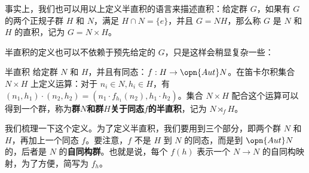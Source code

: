 事实上，我们也可以用以上定义半直积的语言来描述直积：给定群 $G$，如果有 $G$ 的两个正规子群 $H$ 和 $N$，满足 $H\cap N=\{e\}$，并且 $G=NH$，那么称 $G$ 是 $N$ 和 $H$ 的直积，记为 $G=N\times H$。

半直积的定义也可以不依赖于预先给定的 $G$，只是这样会稍显复杂一些：

\begin{definition}{半直积}
给定群 $N$ 和 $H$，并且有同态：$f:H\rightarrow \opn{Aut}N$。在笛卡尔积集合 $N\times H$ 上定义运算：对于 $n_i\in N, h_i\in H$，有 $(n_1, h_1)\cdot(n_2, h_2)=(n_1\cdot f_{h_1}(n_2), h_1\cdot h_2)$。集合 $N\times H$ 配合这个运算可以得到一个群，称为\textbf{群}$N$\textbf{和群}$H$\textbf{关于同态}$f$\textbf{的半直积}，记为 $N\rtimes_fH$。
\end{definition}

我们梳理一下这个定义。为了定义半直积，我们要用到三个部分，即两个群 $N$ 和 $H$，再加上一个同态 $f$。要注意，$f$ 不是 $H$ 到 $N$ 的同态，而是到 $\opn{Aut} N$ 的，后者是 $N$ 的\textbf{自同构群}。也就是说，每个 $f(h)$ 表示一个 $N\rightarrow N$ 的自同构映射，为了方便，简写为 $f_h$。













